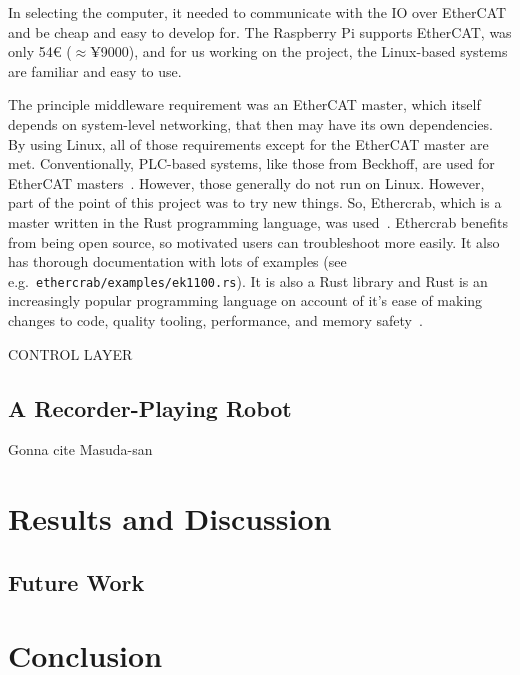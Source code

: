 \documentclass[english,12pt,a4paper,pdftex,eng,utf8]{aaltothesis}
\begin{document}
In selecting the computer, it needed to communicate with the IO over EtherCAT and be cheap and easy to develop for.  The Raspberry Pi supports EtherCAT, was only 54€ ($\approx$¥9000), and for us working on the project, the Linux-based systems are familiar and easy to use.

The principle middleware requirement was an EtherCAT master, which itself depends on system-level networking, that then may have its own dependencies.  By using Linux, all of those requirements except for the EtherCAT master are met.  Conventionally, PLC-based systems, like those from Beckhoff, are used for EtherCAT masters~\cite{BeckhoffTwinCAT}.  However, those generally do not run on Linux.  However, part of the point of this project was to try new things.  So, Ethercrab, which is a master written in the Rust programming language, was used~\cite{Ethercrab}.  Ethercrab benefits from being open source, so motivated users can troubleshoot more easily.  It also has thorough documentation with lots of examples (see e.g.\ \verb|ethercrab/examples/ek1100.rs|).  It is also a Rust library and Rust is an increasingly popular programming language on account of it's ease of making changes to code, quality tooling, performance, and memory safety~\cite{RustHomePage}.

CONTROL LAYER

\subsection{A Recorder-Playing Robot}

Gonna cite Masuda-san~\cite{Masuda2012}

\lipsum[1-3]

\clearpage


\section{Results and Discussion}

\lipsum[1-3]

\subsection{Future Work}

\lipsum[8-9]

\clearpage


\section{Conclusion}

\lipsum[1-4]

\clearpage

{}




\clearpage

\thesisappendix

\end{document}
